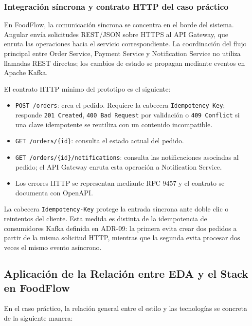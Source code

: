 \documentclass[12pt,a4paper]{article}
\begin{document}
\subsubsection{Integración síncrona y contrato HTTP del caso práctico}

En FoodFlow, la comunicación síncrona se concentra en el borde del sistema. Angular envía solicitudes REST/JSON sobre HTTPS al API Gateway, que enruta las operaciones hacia el servicio correspondiente. La coordinación del flujo principal entre Order Service, Payment Service y Notification Service no utiliza llamadas REST directas; los cambios de estado se propagan mediante eventos en Apache Kafka.

El contrato HTTP mínimo del prototipo es el siguiente:

\begin{itemize}[leftmargin=*]
    \item \texttt{POST /orders}: crea el pedido. Requiere la cabecera \texttt{Idempotency-Key}; responde \texttt{201 Created}, \texttt{400 Bad Request} por validación o \texttt{409 Conflict} si una clave idempotente se reutiliza con un contenido incompatible.
    \item \texttt{GET /orders/\{id\}}: consulta el estado actual del pedido.
    \item \texttt{GET /orders/\{id\}/notifications}: consulta las notificaciones asociadas al pedido; el API Gateway enruta esta operación a Notification Service.
    \item Los errores HTTP se representan mediante RFC 9457 y el contrato se documenta con OpenAPI.
\end{itemize}

La cabecera \texttt{Idempotency-Key} protege la entrada síncrona ante doble clic o reintentos del cliente. Esta medida es distinta de la idempotencia de consumidores Kafka definida en ADR-09: la primera evita crear dos pedidos a partir de la misma solicitud HTTP, mientras que la segunda evita procesar dos veces el mismo evento asíncrono.


\subsection{Aplicación de la Relación entre EDA y el Stack en FoodFlow}

En el caso práctico, la relación general entre el estilo y las tecnologías se concreta de la siguiente manera:
\end{document}
